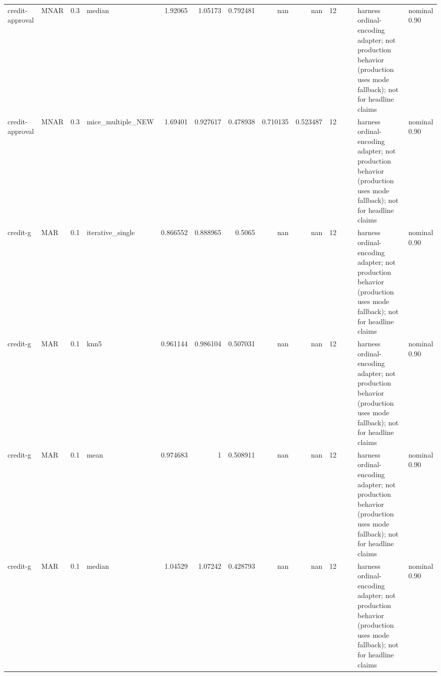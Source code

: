 \begin{table}[ht]
\begin{tabular}{llrlrrrrrrllll}
 credit-approval      & MNAR        &         0.3 & median            &       1.92065  &             1.05173  &                 0.792481 &                     nan        &                       nan        &        12 &                    &                                         & harness ordinal-encoding adapter; not production behavior (production uses mode fallback); not for headline claims & nominal 0.90              \\
 credit-approval      & MNAR        &         0.3 & mice\_multiple\_NEW &       1.69401  &             0.927617 &                 0.478938 &                       0.710135 &                         0.523487 &        12 &                    &                                         & harness ordinal-encoding adapter; not production behavior (production uses mode fallback); not for headline claims & nominal 0.90              \\
 credit-g             & MAR         &         0.1 & iterative\_single  &       0.866552 &             0.888965 &                 0.5065   &                     nan        &                       nan        &        12 &                    &                                         & harness ordinal-encoding adapter; not production behavior (production uses mode fallback); not for headline claims & nominal 0.90              \\
 credit-g             & MAR         &         0.1 & knn5              &       0.961144 &             0.986104 &                 0.507031 &                     nan        &                       nan        &        12 &                    &                                         & harness ordinal-encoding adapter; not production behavior (production uses mode fallback); not for headline claims & nominal 0.90              \\
 credit-g             & MAR         &         0.1 & mean              &       0.974683 &             1        &                 0.508911 &                     nan        &                       nan        &        12 &                    &                                         & harness ordinal-encoding adapter; not production behavior (production uses mode fallback); not for headline claims & nominal 0.90              \\
 credit-g             & MAR         &         0.1 & median            &       1.04529  &             1.07242  &                 0.428793 &                     nan        &                       nan        &        12 &                    &                                         & harness ordinal-encoding adapter; not production behavior (production uses mode fallback); not for headline claims & nominal 0.90              \\

\end{tabular}
\end{table}
